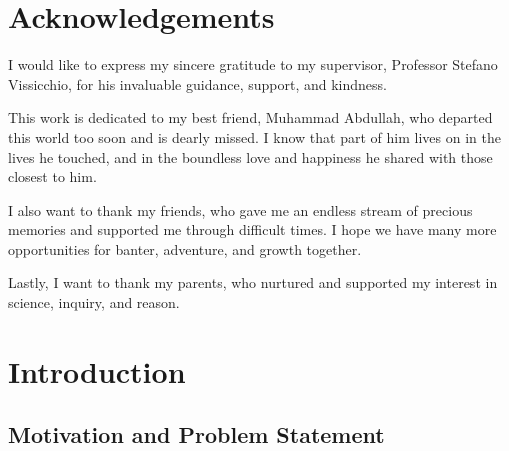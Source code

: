 \documentclass[12pt, a4paper]{report}
\begin{document}
\chapter*{Acknowledgements}
\begingroup
\setlength{\parindent}{0pt}
\setlength{\parskip}{1em}

I would like to express my sincere gratitude to my supervisor, Professor Stefano Vissicchio, for his invaluable guidance, support, and kindness.

This work is dedicated to my best friend, Muhammad Abdullah, who departed this world too soon and is dearly missed. I know that part of him lives on in the lives he touched, and in the boundless love and happiness he shared with those closest to him.

I also want to thank my friends, who gave me an endless stream of precious memories and supported me through difficult times. I hope we have many more opportunities for banter, adventure, and growth together.

Lastly, I want to thank my parents, who nurtured and supported my interest in science, inquiry, and reason.
\endgroup

\newpage

\tableofcontents


\chapter{Introduction}
\section{Motivation and Problem Statement}
\end{document}
